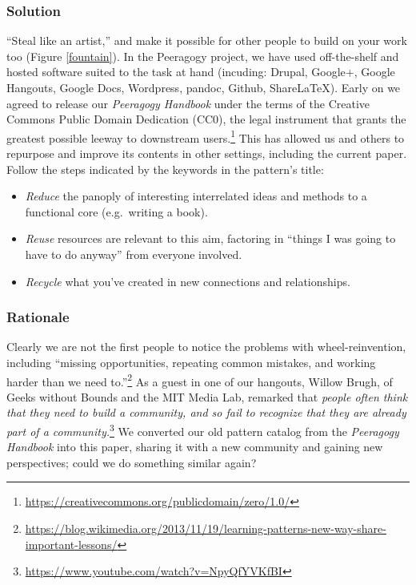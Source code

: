 \subsubsection*{Solution} ``Steal like an artist,'' and make it possible for other people to build on your work too (Figure \ref{fountain}).  In the Peeragogy project, we have used off-the-shelf and hosted software suited to the task at hand (incuding: Drupal, Google+, Google Hangouts, Google Docs, Wordpress, pandoc, Github, ShareLaTeX).  Early on we agreed to release our \emph{Peeragogy Handbook} under the terms of the Creative Commons Public Domain Dedication (CC0), the legal instrument that grants the greatest possible leeway to downstream users.\footnote{\url{https://creativecommons.org/publicdomain/zero/1.0/}}  This has allowed us and others to repurpose and improve its contents in other settings, including the current paper.  Follow the steps indicated by the keywords in the pattern's title: 
\vspace{-1mm}
\begin{itemize}
\item \emph{Reduce} the panoply of interesting interrelated ideas and methods to a functional core (e.g.~writing a book).
\item \emph{Reuse} resources are relevant to this aim, factoring in ``things I was going to have to do anyway'' from everyone involved.
\item  \emph{Recycle} what you've created in new connections and relationships.
\end{itemize}

\subsubsection*{Rationale} 
Clearly we are not the first people to notice the problems with wheel-reinvention, including ``missing opportunities, repeating common mistakes, and working harder than we need to.''\footnote{\url{https://blog.wikimedia.org/2013/11/19/learning-patterns-new-way-share-important-lessons/}}  As a guest in  one of our hangouts, Willow Brugh, of Geeks without Bounds and the MIT Media Lab, remarked that \emph{people often think that they need to build a community, and so fail to recognize that they are already part of a community.}\footnote{\url{https://www.youtube.com/watch?v=NpyQfYVKfBI}}
We converted our old pattern catalog from the \emph{Peeragogy Handbook} into this paper, sharing it with a new community and gaining new perspectives; could we do something similar again?

